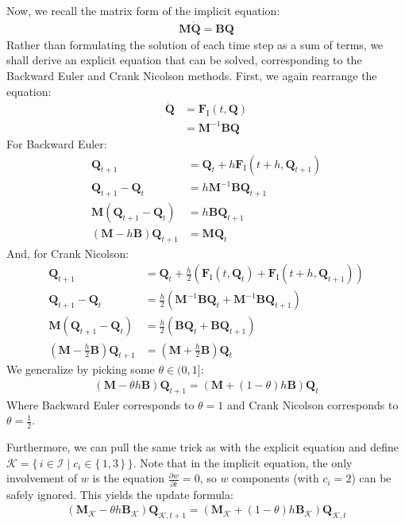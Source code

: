 \documentclass{article}
\newcommand{\bvec}[1]{\boldsymbol{#1}}
\newcommand{\bmat}[1]{\boldsymbol{#1}}
\begin{document}
Now, we recall the matrix form of the implicit equation:
\begin{align*}
    \bmat{M} \dot{\bvec{Q}} = \bmat{B} \bvec{Q}
\end{align*}
Rather than formulating the solution of each time step as a sum of terms,
we shall derive an explicit equation that can be solved,
corresponding to the Backward Euler and Crank Nicolson methods.
First, we again rearrange the equation:
\begin{align*}
    \dot{\bvec{Q}}
        & = \bvec{F}_\text{I}(t, \bvec{Q}) \\
        & = \bmat{M}^{-1} \bmat{B} \bvec{Q}
\end{align*}
\noindent For Backward Euler:
\begin{align*}
    \bvec{Q}_{t + 1} & = \bvec{Q}_t + h \bvec{F}_\text{I}(t + h, \bvec{Q}_{t + 1}) \\
    \bvec{Q}_{t + 1} - \bvec{Q}_t & = h \bmat{M}^{-1} \bmat{B} \bvec{Q}_{t + 1} \\
    \bmat{M} (\bvec{Q}_{t + 1} - \bvec{Q}_t) & = h \bmat{B} \bvec{Q}_{t + 1} \\
    (\bmat{M} - h \bmat{B}) \bvec{Q}_{t + 1} & = \bmat{M} \bvec{Q}_t
\end{align*}
\noindent And, for Crank Nicolson:
\begin{align*}
    \bvec{Q}_{t + 1} & = \bvec{Q}_t + \frac{h}{2}
        (\bvec{F}_\text{I}(t, \bvec{Q}_t) + \bvec{F}_\text{I}(t + h, \bvec{Q}_{t + 1})) \\
    \bvec{Q}_{t + 1} - \bvec{Q}_t & = \frac{h}{2}
        (\bmat{M}^{-1} \bmat{B} \bvec{Q}_t + \bmat{M}^{-1} \bmat{B} \bvec{Q}_{t + 1}) \\
    \bmat{M} (\bvec{Q}_{t + 1} - \bvec{Q}_t) & = \frac{h}{2}
        (\bmat{B} \bvec{Q}_t + \bmat{B} \bvec{Q}_{t + 1}) \\
    (\bmat{M} - \frac{h}{2} \bmat{B}) \bvec{Q}_{t + 1} & = (\bmat{M} + \frac{h}{2} \bmat{B}) \bvec{Q}_t
\end{align*}
\noindent We generalize by picking some $\theta \in (0, 1]$:
\begin{align*}
    (\bmat{M} - \theta h \bmat{B}) \bvec{Q}_{t + 1} = (\bmat{M} + (1 - \theta) h \bmat{B}) \bvec{Q}_t
\end{align*}
\noindent Where Backward Euler corresponds to $\theta = 1$
and Crank Nicolson corresponds to $\theta = \frac{1}{2}$.

Furthermore, we can pull the same trick as with the explicit equation
and define $\mathcal{K} = \{\, i \in \mathcal{I} \mid c_i \in \{\, 1, 3 \,\} \,\}$.
Note that in the implicit equation, the only involvement of $w$ is
the equation $\frac{\partial w}{\partial t} = 0$,
so $w$ components (with $c_i = 2$) can be safely ignored.
This yields the update formula:
\begin{align*}
    (\bmat{M}_\mathcal{K} - \theta h \bmat{B}_\mathcal{K}) \bvec{Q}_{\mathcal{K}, t + 1}
        = (\bmat{M}_\mathcal{K} + (1 - \theta) h \bmat{B}_\mathcal{K}) \bvec{Q}_{\mathcal{K}, t}
\end{align*}
\end{document}
